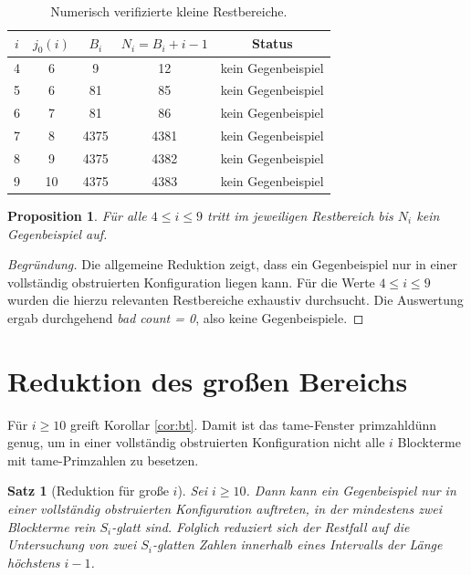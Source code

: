 \documentclass[12pt,a4paper]{article}
\theoremstyle{plain}
\newtheorem{satz}{Satz}
\newtheorem{proposition}{Proposition}
\theoremstyle{definition}
\theoremstyle{remark}
\begin{document}
	\begin{table}[h]
		\centering
		\begin{tabular}{ccccc}
			\toprule
			$i$ & $j_0(i)$ & $B_i$ & $N_i=B_i+i-1$ & Status \\
			\midrule
			4 & 6  & 9    & 12   & kein Gegenbeispiel \\
			5 & 6  & 81   & 85   & kein Gegenbeispiel \\
			6 & 7  & 81   & 86   & kein Gegenbeispiel \\
			7 & 8  & 4375 & 4381 & kein Gegenbeispiel \\
			8 & 9  & 4375 & 4382 & kein Gegenbeispiel \\
			9 & 10 & 4375 & 4383 & kein Gegenbeispiel \\
			\bottomrule
		\end{tabular}
		\caption{Numerisch verifizierte kleine Restbereiche.}
		\label{tab:smallcases}
	\end{table}
	
	\begin{proposition}\label{prop:small49}
		Für alle $4\le i\le 9$ tritt im jeweiligen Restbereich bis $N_i$ kein Gegenbeispiel auf.
	\end{proposition}
	
	\begin{proof}[Begründung]
		Die allgemeine Reduktion zeigt, dass ein Gegenbeispiel nur in einer vollständig obstruierten Konfiguration liegen kann. 
		Für die Werte $4\le i\le 9$ wurden die hierzu relevanten Restbereiche exhaustiv durchsucht. 
		Die Auswertung ergab durchgehend \emph{bad count = 0}, also keine Gegenbeispiele.
	\end{proof}
	
	\section{Reduktion des großen Bereichs}
	
	Für $i\ge 10$ greift Korollar \ref{cor:bt}. 
	Damit ist das tame-Fenster primzahldünn genug, um in einer vollständig obstruierten Konfiguration nicht alle $i$ Blockterme mit tame-Primzahlen zu besetzen.
	
	\begin{satz}[Reduktion für große $i$]
		Sei $i\ge 10$. 
		Dann kann ein Gegenbeispiel nur in einer vollständig obstruierten Konfiguration auftreten, in der mindestens zwei Blockterme rein $S_i$-glatt sind. 
		Folglich reduziert sich der Restfall auf die Untersuchung von zwei $S_i$-glatten Zahlen innerhalb eines Intervalls der Länge höchstens $i-1$.
	\end{satz}
	
\end{document}
